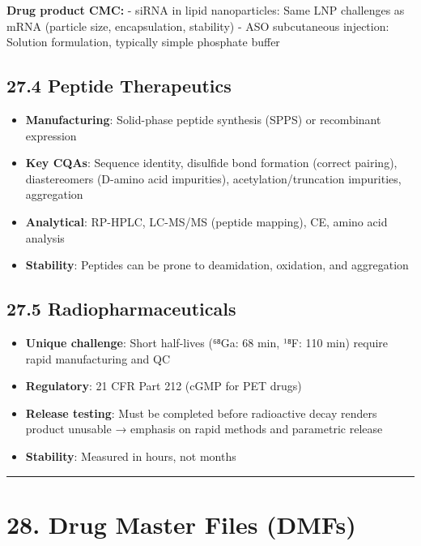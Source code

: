 \documentclass[
  11pt,
  a4paper,
]{report}
\providecommand{\tightlist}{%
  \setlength{\itemsep}{0pt}\setlength{\parskip}{0pt}}
\begin{document}
\textbf{Drug product CMC:} - siRNA in lipid nanoparticles: Same LNP
challenges as mRNA (particle size, encapsulation, stability) - ASO
subcutaneous injection: Solution formulation, typically simple phosphate
buffer

\hypertarget{peptide-therapeutics}{%
\subsection{27.4 Peptide Therapeutics}\label{peptide-therapeutics}}

\begin{itemize}
\tightlist
\item
  \textbf{Manufacturing}: Solid-phase peptide synthesis (SPPS) or
  recombinant expression
\item
  \textbf{Key CQAs}: Sequence identity, disulfide bond formation
  (correct pairing), diastereomers (D-amino acid impurities),
  acetylation/truncation impurities, aggregation
\item
  \textbf{Analytical}: RP-HPLC, LC-MS/MS (peptide mapping), CE, amino
  acid analysis
\item
  \textbf{Stability}: Peptides can be prone to deamidation, oxidation,
  and aggregation
\end{itemize}

\hypertarget{radiopharmaceuticals}{%
\subsection{27.5 Radiopharmaceuticals}\label{radiopharmaceuticals}}

\begin{itemize}
\tightlist
\item
  \textbf{Unique challenge}: Short half-lives (⁶⁸Ga: 68 min, ¹⁸F: 110
  min) require rapid manufacturing and QC
\item
  \textbf{Regulatory}: 21 CFR Part 212 (cGMP for PET drugs)
\item
  \textbf{Release testing}: Must be completed before radioactive decay
  renders product unusable → emphasis on rapid methods and parametric
  release
\item
  \textbf{Stability}: Measured in hours, not months
\end{itemize}

\begin{center}\rule{0.5\linewidth}{0.5pt}\end{center}

\hypertarget{drug-master-files-dmfs}{%
\section{28. Drug Master Files (DMFs)}\label{drug-master-files-dmfs}}
\end{document}
